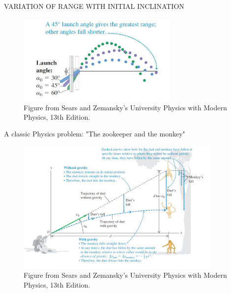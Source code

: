 \documentclass[]{beamer}
\begin{document}


\begin{frame}

VARIATION OF RANGE WITH INITIAL INCLINATION
\vspace{3mm}

\begin{figure}[h!]  
    \includegraphics[width=0.7\textwidth]{images/24.jpg}
     \caption{ {\tiny Figure from Sears and Zemansky's University Physics 
     with Modern Physics, 13th Edition.} }
  \end{figure}

  \end{frame}
  






\begin{frame}

    A classic Physics problem: "The zookeeper and the monkey"
    
    \vspace{3mm}
    
    \begin{figure}[h!]  
        \includegraphics[width=0.9\textwidth]{images/25.jpg}
         \caption{ {\tiny Figure from Sears and Zemansky's University Physics 
         with Modern Physics, 13th Edition.} }
      \end{figure}
    
      \end{frame}
\end{document}
